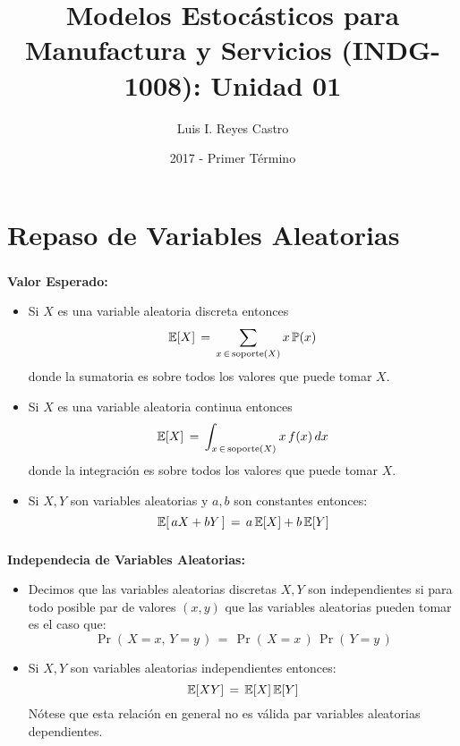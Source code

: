 \documentclass[ 10pt, xcolor = dvipsnames]{beamer}
\title[\shorttitle]{Modelos Estoc\'asticos para Manufactura y Servicios (INDG-1008): \textbf{Unidad 01} }
\author[L. I. Reyes Castro]{Luis I. Reyes Castro}
\institute[ESPOL]{\normalsize Escuela Superior Polit\'ecnica del Litoral (ESPOL) \\ Guayaquil - Ecuador}
\date[2017-T1]{2017 - Primer T\'ermino}
\begin{document}



\section{Repaso de Variables Aleatorias}

\begin{frame}[allowframebreaks]
\frametitle{\insertsection}

\textbf{Valor Esperado:}
\begin{itemize}
\item Si $X$ es una variable aleatoria discreta entonces 
\[
\mathbb{E}[X] \, = \, \sum_{ x \, \in \, \text{soporte}(X) } x \, \mathbb{P}(x)
\]
donde la sumatoria es sobre todos los valores que puede tomar $X$. 
\item Si $X$ es una variable aleatoria continua entonces 
\[
\mathbb{E}[X] \, = \, \int_{ x \, \in \, \text{soporte}(X) } x \, f(x) \, dx
\]
donde la integraci\'on es sobre todos los valores que puede tomar $X$. 
\item Si $X,Y$ son variables aleatorias y $a,b$ son constantes entonces: 
\[
\mathbb{E}[ \, a X + b Y \, ] \, = \, a \, \mathbb{E}[X] + b \, \mathbb{E}[Y]
\]
\end{itemize}

\end{frame}

\begin{frame}[allowframebreaks]
\frametitle{\insertsection}

\textbf{Independecia de Variables Aleatorias:}
\begin{itemize}
\item Decimos que las variables aleatorias discretas $X,Y$ son independientes si \linebreak para todo posible par de valores $(x,y)$ que las variables aleatorias \linebreak pueden tomar es el caso que: 
\[
\Pr( \, X = x, \, Y = y \, ) \, = \,
\Pr( \, X = x \, ) \, \Pr( \, Y = y \, )
\]
\item Si $X,Y$ son variables aleatorias independientes entonces: 
\[
\mathbb{E}[XY] \, = \, \mathbb{E}[X] \, \mathbb{E}[Y]
\]
N\'otese que esta relaci\'on en general no es v\'alida par variables aleatorias dependientes. 
\end{itemize}

\end{frame}
\end{document}
